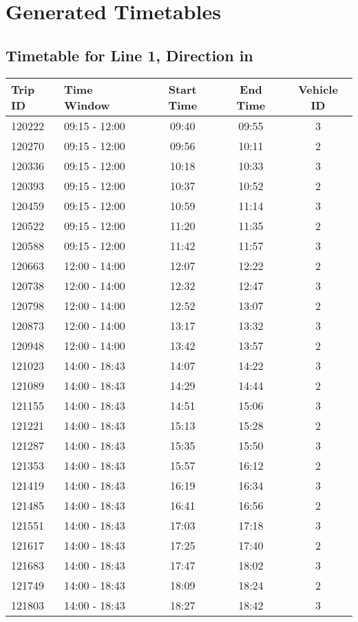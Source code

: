 \documentclass{article}
\begin{document}
            \section*{Generated Timetables}
            \subsection*{Timetable for Line 1, Direction in}
\begin{tabular}{llccc}
\toprule
Trip ID & Time Window & Start Time & End Time & Vehicle ID \\
\midrule
120222 & 09:15 - 12:00 & 09:40 & 09:55 & 3 \\
120270 & 09:15 - 12:00 & 09:56 & 10:11 & 2 \\
120336 & 09:15 - 12:00 & 10:18 & 10:33 & 3 \\
120393 & 09:15 - 12:00 & 10:37 & 10:52 & 2 \\
120459 & 09:15 - 12:00 & 10:59 & 11:14 & 3 \\
120522 & 09:15 - 12:00 & 11:20 & 11:35 & 2 \\
120588 & 09:15 - 12:00 & 11:42 & 11:57 & 3 \\
120663 & 12:00 - 14:00 & 12:07 & 12:22 & 2 \\
120738 & 12:00 - 14:00 & 12:32 & 12:47 & 3 \\
120798 & 12:00 - 14:00 & 12:52 & 13:07 & 2 \\
120873 & 12:00 - 14:00 & 13:17 & 13:32 & 3 \\
120948 & 12:00 - 14:00 & 13:42 & 13:57 & 2 \\
121023 & 14:00 - 18:43 & 14:07 & 14:22 & 3 \\
121089 & 14:00 - 18:43 & 14:29 & 14:44 & 2 \\
121155 & 14:00 - 18:43 & 14:51 & 15:06 & 3 \\
121221 & 14:00 - 18:43 & 15:13 & 15:28 & 2 \\
121287 & 14:00 - 18:43 & 15:35 & 15:50 & 3 \\
121353 & 14:00 - 18:43 & 15:57 & 16:12 & 2 \\
121419 & 14:00 - 18:43 & 16:19 & 16:34 & 3 \\
121485 & 14:00 - 18:43 & 16:41 & 16:56 & 2 \\
121551 & 14:00 - 18:43 & 17:03 & 17:18 & 3 \\
121617 & 14:00 - 18:43 & 17:25 & 17:40 & 2 \\
121683 & 14:00 - 18:43 & 17:47 & 18:02 & 3 \\
121749 & 14:00 - 18:43 & 18:09 & 18:24 & 2 \\
121803 & 14:00 - 18:43 & 18:27 & 18:42 & 3 \\
\bottomrule
\end{tabular}
\end{document}
